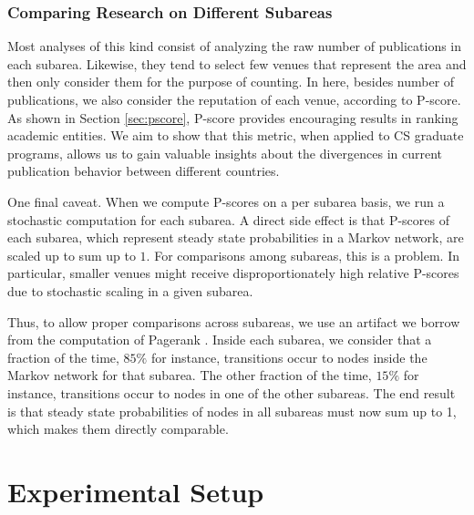 \documentclass[msc]{ppgccufmg}
\begin{document}
\subsection*{Comparing Research on Different Subareas}

Most analyses of this kind consist of analyzing the raw number of publications in each subarea. Likewise, they tend to select few venues that represent the area and then only consider them for the purpose of counting. In here, besides number of publications, we also consider the reputation of each venue, according to P-score. As shown in Section \ref{sec:pscore}, P-score provides encouraging results in ranking academic entities. We aim to show that this metric, when applied to CS graduate programs, allows us to gain valuable insights about the divergences in current publication behavior between different countries.

One final caveat. When we compute P-scores on a per subarea basis, we run a stochastic computation for each subarea. A direct side effect is that P-scores of each subarea, which represent steady state probabilities in a Markov network, are scaled up to sum up to $1$. For comparisons among subareas, this is a problem. In particular, smaller venues might receive disproportionately high relative P-scores due to stochastic scaling in a given subarea. 

Thus, to allow proper comparisons across subareas, we use an artifact we borrow from the computation of Pagerank \citep{page98pagerank}. Inside each subarea, we consider that a fraction of the time, $85\%$ for instance, transitions occur to nodes inside the Markov network for that subarea. The other fraction of the time, $15\%$ for instance, transitions occur to nodes in one of the other subareas. The end result is that steady state probabilities of nodes in all subareas must now sum up to 1, which makes them directly comparable. 



\chapter{Experimental Setup}\label{sec:setup}
\end{document}
